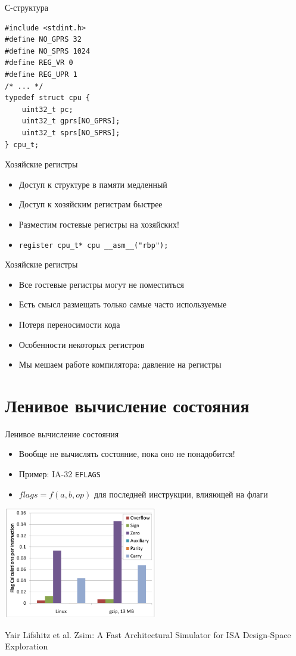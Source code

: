 \documentclass{beamer}
\begin{document}
\begin{frame}[fragile]{С-структура}
\begin{verbatim}
#include <stdint.h>
#define NO_GPRS 32
#define NO_SPRS 1024
#define REG_VR 0
#define REG_UPR 1
/* ... */
typedef struct cpu {
    uint32_t pc;
    uint32_t gprs[NO_GPRS];
    uint32_t sprs[NO_SPRS];
} cpu_t;
\end{verbatim}

\end{frame}

\begin{frame}{Хозяйские регистры}
\begin{itemize}
\item Доступ к структуре в памяти медленный
\item Доступ к хозяйским регистрам быстрее
\item Разместим гостевые регистры на хозяйских!
\item \texttt{register cpu_t* cpu __asm__("rbp");}
\end{itemize}
\end{frame}

\begin{frame}[fragile]{Хозяйские регистры}
\begin{itemize}
\item Все гостевые регистры могут не поместиться
\item Есть смысл размещать только самые часто используемые
\item Потеря переносимости кода
\item Особенности некоторых регистров
\item Мы мешаем работе компилятора: давление на регистры
\end{itemize}
\end{frame}

\section{Ленивое вычисление состояния}
\begin{frame}{Ленивое вычисление состояния}
\begin{itemize}
\item Вообще не вычислять состояние, пока оно не понадобится!
\item Пример: IA-32 \texttt{EFLAGS}
\item $flags = f(a, b, op)$ для последней инструкции, влияющей на флаги
\end{itemize}

\centering
\includegraphics[width=0.5\textwidth]{lazy-eflags}

\tiny{Yair Lifshitz et al. Zsim: A Fast Architectural Simulator for ISA Design-Space Exploration}
\end{frame}
\end{document}

